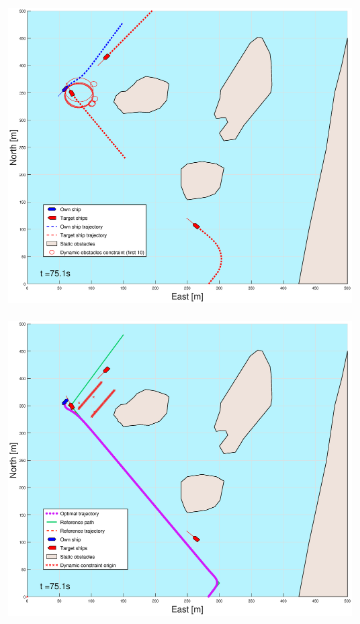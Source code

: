 \begin{figure}[!ht]
\begin{subfigure}[b]{0.499\textwidth}
    \end{subfigure}
    \hfill
    \\
    \begin{subfigure}[b]{0.49\textwidth}
        \centering
        \includegraphics[width=\textwidth]{Images/Figures/Helloya_Rev/_Simple_0fig1_time=75}
    \end{subfigure}
    \hfill
    \begin{subfigure}[b]{0.499\textwidth}
        \centering
        \includegraphics[width=\textwidth]{Images/Figures/Helloya_Rev/_Simple_0fig999_time=75}

\end{subfigure}
\end{figure}
